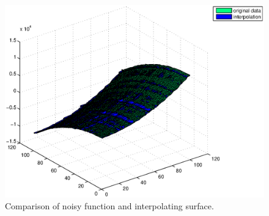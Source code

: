 \documentclass[12pt,a4paper]{article}
\begin{document}
\begin{figure}[hbtp]
\centering
\includegraphics[height=0.45\textheight]{noisyVSInterpol.eps}
\caption{Comparison of noisy function and interpolating surface.}
\label{fig:nVSi}
\end{figure}
\end{document}
